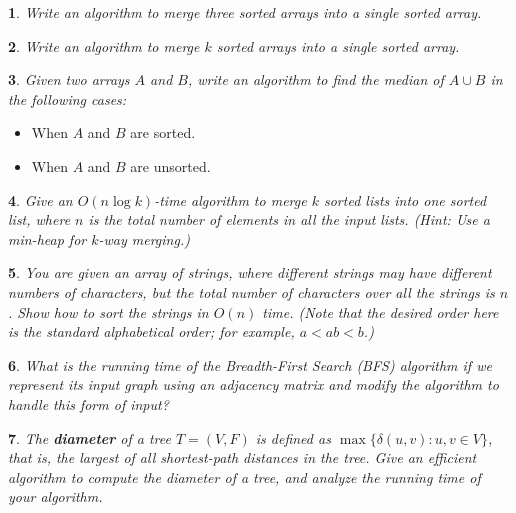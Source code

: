 \documentclass[%
addpoints]{exam}
\theoremstyle{problem}
\newtheorem{p}{}
\begin{document}
\newpage

\begin{p}
Write an algorithm to merge three sorted arrays into a single sorted array.\\
\hfill \end{p}

\begin{p}
Write an algorithm to merge \( k \) sorted arrays into a single sorted array.\\
\hfill \end{p}

\begin{p}
Given two arrays \( A \) and \( B \), write an algorithm to find the median of \( A \cup B \) in the following cases:  
\hfill \end{p}
\begin{itemize}
    \item When \( A \) and \( B \) are sorted.
    \item When \( A \) and \( B \) are unsorted.
\end{itemize}

\begin{p}
Give an \( O(n \log k) \)-time algorithm to merge \( k \) sorted lists into one sorted list,  
where \( n \) is the total number of elements in all the input lists. (Hint: Use a min-heap for \( k \)-way merging.)
\hfill \end{p}

\begin{p}
You are given an array of strings, where different strings may have different  
numbers of characters, but the total number of characters over all the strings  
is \( n \). Show how to sort the strings in \( O(n) \) time.  
(Note that the desired order here is the standard alphabetical order; for example,  
\( a < ab < b \).)
\hfill \end{p}

\begin{p}
What is the running time of the Breadth-First Search (BFS) algorithm if we represent its input graph using an adjacency matrix and modify the algorithm to handle this form of input?
\hfill \end{p}

\begin{p}
The \textbf{diameter} of a tree \( T = (V, F) \) is defined as \( \max \{ \delta(u, v) : u, v \in V \} \), that is, the largest of all shortest-path distances in the tree. Give an efficient algorithm to compute the diameter of a tree, and analyze the running time of your algorithm.
\hfill \end{p}
\end{document}
